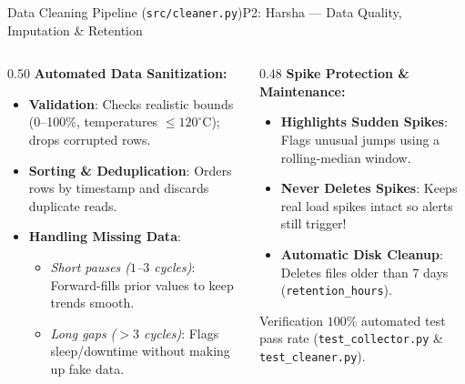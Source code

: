 \begin{frame}{Data Cleaning Pipeline (\texttt{src/cleaner.py})}{P2: Harsha --- Data Quality, Imputation \& Retention}
\begin{columns}[T]
\begin{column}{0.50\textwidth}
\textbf{Automated Data Sanitization:}
\begin{itemize}
    \item \textbf{Validation}: Checks realistic bounds (0--100\%, temperatures $\le 120^\circ\text{C}$); drops corrupted rows.
    \item \textbf{Sorting \& Deduplication}: Orders rows by timestamp and discards duplicate reads.
    \item \textbf{Handling Missing Data}:
    \begin{itemize}
        \item \emph{Short pauses ($1$--$3$ cycles)}: Forward-fills prior values to keep trends smooth.
        \item \emph{Long gaps ($>3$ cycles)}: Flags sleep/downtime without making up fake data.
    \end{itemize}
\end{itemize}
\end{column}

\begin{column}{0.48\textwidth}
\textbf{Spike Protection \& Maintenance:}
\begin{itemize}
    \item \textbf{Highlights Sudden Spikes}: Flags unusual jumps using a rolling-median window.
    \item \textbf{Never Deletes Spikes}: Keeps real load spikes intact so alerts still trigger!
    \item \textbf{Automatic Disk Cleanup}: Deletes files older than 7 days (\texttt{retention\_hours}).
\end{itemize}

\vspace{0.3em}
\begin{block}{Verification}
$100\%$ automated test pass rate (\texttt{test\_collector.py} \& \texttt{test\_cleaner.py}).
\end{block}
\end{column}
\end{columns}
\end{frame}
